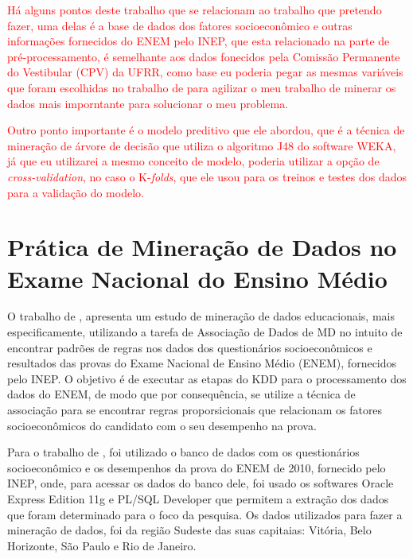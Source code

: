 \par
\textcolor{red}{Há alguns pontos deste trabalho que se relacionam ao trabalho que pretendo fazer, uma delas é a base de dados dos fatores socioeconômico e outras informações fornecidos do ENEM pelo INEP, que esta relacionado na parte de pré-processamento, é semelhante aos dados fonecidos pela Comissão Permanente do Vestibular (CPV) da UFRR, como base eu poderia pegar as mesmas variáveis que foram escolhidas no trabalho de  para agilizar o meu trabalho de minerar os dados mais imporntante para solucionar o meu problema.}
\par
\textcolor{red}{Outro ponto importante é o modelo preditivo que ele abordou, que é a técnica de mineração de árvore de decisão que utiliza o algoritmo J48 do software WEKA, já que eu utilizarei a mesmo conceito de modelo, poderia utilizar a opção de \textit{cross-validation}, no caso o K-\textit{folds}, que ele usou para os treinos e testes dos dados para a validação do modelo.}



\section{Prática de Mineração de Dados no Exame Nacional do Ensino Médio}

\par
O trabalho de , apresenta um estudo de mineração de dados educacionais, mais especificamente, utilizando a tarefa de Associação de Dados de MD no intuito de encontrar padrões de regras nos dados dos questionários socioeconômicos e resultados das provas do Exame Nacional de Ensino Médio (ENEM), fornecidos pelo INEP. O objetivo é de executar as etapas do KDD para o processamento dos dados do ENEM, de modo que por consequência, se utilize a técnica de associação para se encontrar regras proporsicionais que relacionam os fatores socioeconômicos do candidato com o seu desempenho na prova.

\par
Para o trabalho de , foi utilizado o banco de dados com os questionários socioeconômico e os desempenhos da prova do ENEM de 2010, fornecido pelo INEP, onde, para acessar os dados do banco dele, foi usado os softwares Oracle Express Edition 11g e PL/SQL Developer que permitem a extração dos dados que foram determinado para o foco da pesquisa. Os dados utilizados para fazer a mineração de dados, foi da região Sudeste das suas capitaias: Vitória, Belo Horizonte, São Paulo e Rio de Janeiro.

